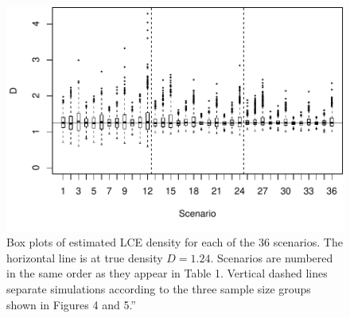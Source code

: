 \documentclass[useAMS, usenatbib, referee]{biom}\usepackage[]{graphicx}\usepackage[]{color}
\makeatletter
\def\maxwidth{ %
  \ifdim\Gin@nat@width>\linewidth
    \linewidth
  \else
    \Gin@nat@width
  \fi
}
\newenvironment{knitrout}{}{} %
\makeatother
\begin{document}
\begin{knitrout}
\color{fgcolor}\begin{figure}

{\centering \includegraphics[width=\maxwidth]{figs/fig_boxplots_bcs-1} 

}

\caption[Box plots of estimated LCE density for each of the 36 scenarios]{Box plots of estimated LCE density for each of the 36 scenarios. The horizontal line is at true density \(D=1.24\). Scenarios are numbered in the same order as they appear in Table 1. Vertical dashed lines separate simulations according to the three sample size groups shown in Figures 4 and 5.”}\label{fig:fig_boxplots_bcs}
\end{figure}


\end{knitrout}
\end{document}
